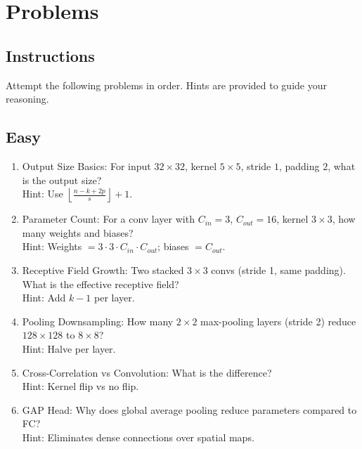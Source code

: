 
\section{Problems}
\label{sec:cnn-problems}

\subsection*{Instructions}
Attempt the following problems in order. Hints are provided to guide your reasoning.

\subsection*{Easy}
\begin{enumerate}[label=E\arabic*.,leftmargin=*]
    \item Output Size Basics: For input $32\times32$, kernel $5\times5$, stride $1$, padding $2$, what is the output size?\\
    Hint: Use $\left\lfloor\frac{n-k+2p}{s}\right\rfloor+1$.
    \item Parameter Count: For a conv layer with $C_{in}=3$, $C_{out}=16$, kernel $3\times3$, how many weights and biases?\\
    Hint: Weights $=3\cdot3\cdot C_{in}\cdot C_{out}$; biases $=C_{out}$.
    \item Receptive Field Growth: Two stacked $3\times3$ convs (stride 1, same padding). What is the effective receptive field?\\
    Hint: Add $k-1$ per layer.
    \item Pooling Downsampling: How many $2\times2$ max-pooling layers (stride 2) reduce $128\times128$ to $8\times8$?\\
    Hint: Halve per layer.
    \item Cross-Correlation vs Convolution: What is the difference?\\
    Hint: Kernel flip vs no flip.
    \item GAP Head: Why does global average pooling reduce parameters compared to FC?\\
    Hint: Eliminates dense connections over spatial maps.
\end{enumerate}

